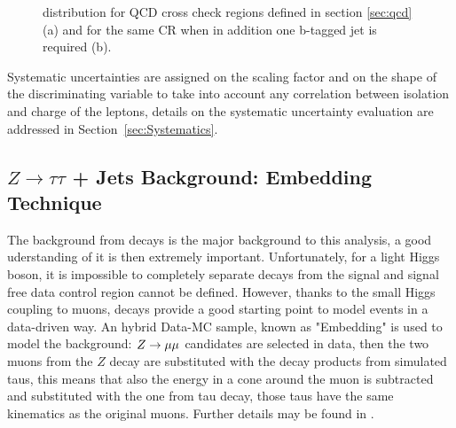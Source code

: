 \begin{figure}[tp]
	\begin{center}
	     
	
	\end{center}
	\caption{\mmc distribution for QCD cross check regions defined in section \ref{sec:qcd} (a) and for the same CR when in addition one b-tagged jet is required (b). }
	\label{fig:ABCD_cr}
\end{figure}


Systematic uncertainties are assigned on the scaling factor \rqcd and on the shape of
the discriminating variable \mmc to take into account any correlation between isolation and charge 
of the leptons, details on the systematic uncertainty evaluation are addressed in Section~\ref{sec:Systematics}.





\subsection{$Z \rightarrow \tau\tau$ + Jets Background: Embedding Technique}
The background from \Ztautau decays is the major background to this analysis, a good uderstanding 
of it is then extremely important.
 Unfortunately, for a light Higgs boson, it is impossible to completely separate \Ztautau decays 
from the signal and signal free data control region cannot be defined.
However, thanks to the small Higgs coupling to muons, \Zmumu decays provide a good starting point to 
model \Ztautau events in a data-driven way. An hybrid Data-MC sample, known as "Embedding" is used to model the \Ztautau background: 
$Z\rightarrow \mu\mu$ candidates are selected in data, then the two muons from the $Z$ decay are substituted with the decay 
products from simulated taus, this means that also the energy in a cone around the muon is subtracted
and substituted with the one from tau decay, those taus have the same kinematics as the original muons. 
Further details may be found in \cite{Embedding, SMold}.

